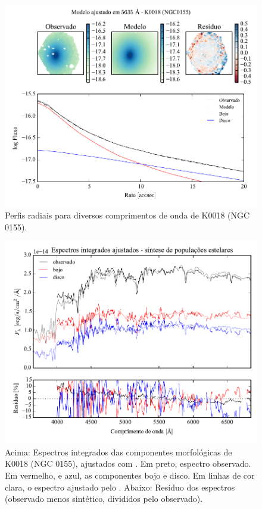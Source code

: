 \begin{figure}
	\includegraphics[page=5]{figuras-decomp/K0018_sample006a}
	\caption[Perfis radiais para diversos comprimentos de onda de K0018 (NGC 0155)]
	{Perfis radiais para diversos comprimentos de onda de K0018 (NGC 0155).}
	\label{fig:decompRadprofSpec:K0018}
\end{figure}

\begin{figure}
	\includegraphics[page=1,width=\textwidth]{figuras/sample006a_synthesis}
	\caption[Espectros ajustados com \starlight das componentes morfológicas de
	K0018 (NGC 0155)]
	{Acima: Espectros integrados das componentes morfológicas de
	K0018 (NGC 0155), ajustados com \starlight. Em preto, espectro observado. Em
	vermelho, e azul, as componentes bojo e disco. Em linhas de cor clara, o
	espectro ajustado pelo \starlight. Abaixo: Resíduo dos espectros (observado
	menos sintético, divididos pelo observado).}
	\label{fig:decompSintese:K0018}
\end{figure}

